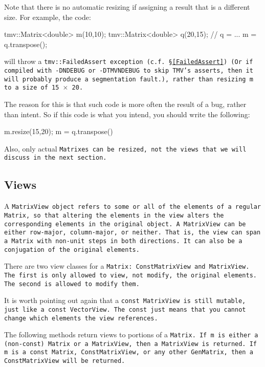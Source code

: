 Note that there is no automatic resizing if assigning a result that is a different size. 
For example, the code:
\begin{tmvcode}
tmv::Matrix<double> m(10,10);
tmv::Matrix<double> q(20,15);
// q = ...
m = q.transpose();
\end{tmvcode}
will throw a \tt{tmv::FailedAssert} exception (c.f. \S\ref{FailedAssert}) (Or if compiled with 
\tt{-DNDEBUG} or \tt{-DTMVNDEBUG} to skip TMV's asserts, then it will probably produce a segmentation fault.),
rather than resizing \tt{m} to a size of 15 $\times$ 20.  

The reason for this is that such code is more often the result of a bug, rather than intent.
So if this code is what you intend, you should write the following:
\begin{tmvcode}
m.resize(15,20);
m = q.transpose()
\end{tmvcode}

Also, only actual \tt{Matrix}es can be resized, not the views that we will discuss in the next section.

\subsection{Views}
\label{Matrix_Views}

A \tt{MatrixView} object refers to some or all of the elements of a regular \tt{Matrix},
so that altering the elements in the view alters the
corresponding elements in the original object.  A \tt{MatrixView}
can be either row-major, column-major, or neither.  That is, the view can 
span a \tt{Matrix} with non-unit steps in both directions.
It can also be a conjugation of the original
elements.

There are two view classes for
a \tt{Matrix}:
\tt{ConstMatrixView} and \tt{MatrixView}.  
The first is only allowed to view,
not modify, the original elements.  The second is allowed to modify them.

It is worth pointing out again that a 
\tt{const MatrixView} is still mutable, just like a \tt{const VectorView}.
The \tt{const} just means that you cannot change which elements
the view references.

The following methods return views to portions of a \tt{Matrix}.
If \tt{m} is either a (non-\tt{const}) \tt{Matrix}
or a \tt{MatrixView}, then a \tt{MatrixView} is returned.
If \tt{m} is a \tt{const Matrix}, \tt{ConstMatrixView}, or any other \tt{GenMatrix},
then a \tt{ConstMatrixView} will be returned. 

